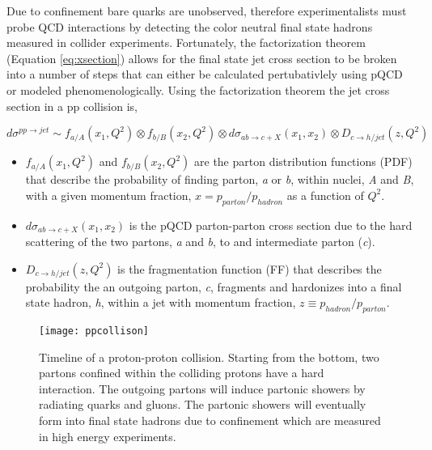 Due to confinement bare quarks are unobserved, therefore experimentalists must probe QCD interactions by detecting the color neutral final state hadrons measured in collider experiments.  Fortunately, the factorization theorem (Equation \ref{eq:xsection}) allows for the final state jet cross section to be broken into a number of steps that can either be calculated pertubativlely using pQCD or modeled phenomenologically.  Using the factorization theorem the jet cross section in a pp collision is,


\begin{equation}
d\sigma^{pp \rightarrow jet} \sim f_{a/A}(x_{1},Q^{2}) \otimes  f_{b/B}(x_{2},Q^{2}) \otimes d\sigma_{ab \rightarrow c + X} (x_{1},x_{2}) \otimes D_{c \rightarrow h/jet}(z,Q^{2})
\label{eq:xsection}
\end{equation}

\noindent
\begin{itemize}
\item  $ f_{a/A}(x_{1},Q^{2})$ and $ f_{b/B}(x_{2},Q^{2})$ are the parton distribution functions (PDF) that describe the probability of finding parton, \textit{a} or \textit{b}, within nuclei, \textit{A} and \textit{B}, with a given momentum fraction, $x = p_{parton} / p_{hadron} $ as a function of $Q^{2}$.
\item  $d\sigma_{ab \rightarrow c + X} (x_{1},x_{2})$ is the pQCD parton-parton cross section due to the hard scattering of the two partons, \textit{a} and \textit{b}, to and intermediate parton (\textit{c}).
\item   $ D_{c \rightarrow h/jet}(z,Q^{2})$ is the fragmentation function (FF) that describes the probability the an outgoing parton, \textit{c}, fragments and hardonizes into a final state hadron, \textit{h}, within a jet with momentum fraction, $z \equiv p_{hadron} / p_{parton}$.
\end{itemize}

\begin{figure}[h]
\texttt{[image: ppcollison]}
\centering
\caption{Timeline of a proton-proton collision.  Starting from the bottom, two partons confined within the colliding protons have a hard interaction.  The outgoing partons will induce partonic showers by radiating quarks and gluons.  The partonic showers will eventually form into final state hadrons due to confinement which are measured in high energy experiments\cite{Dobbs:2001ck}.}
\label{fig:FactorizationCartoon}
\end{figure}

